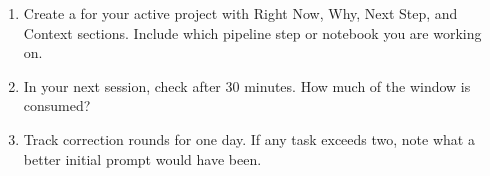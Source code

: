\begin{trybox}
\begin{enumerate}
  \item Create a  for your active project
    with Right Now, Why, Next Step, and Context sections.
    Include which pipeline step or notebook you are working on.
  \item In your next session, check  after 30 minutes.
    How much of the window is consumed?
  \item Track correction rounds for one day. If any task exceeds two,
    note what a better initial prompt would have been.
\end{enumerate}
\end{trybox}
